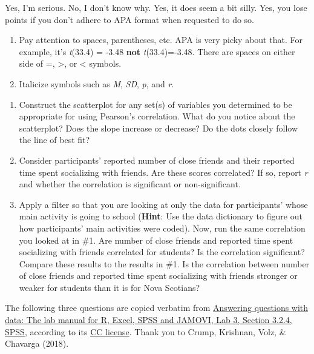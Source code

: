 \documentclass[
]{book}
\begin{document}
Yes, I'm serious. No, I don't know why. Yes, it does seem a bit silly. Yes, you lose points if you don't adhere to APA format when requested to do so.

\begin{enumerate}
\def\labelenumi{\alph{enumi}.}
\setcounter{enumi}{3}
\item
  Pay attention to spaces, parentheses, etc. APA is very picky about that. For example, it's \emph{t}(33.4) = -3.48 \textbf{not} \emph{t}(33.4)=-3.48. There are spaces on either side of =, \textgreater, or \textless{} symbols.
\item
  Italicize symbols such as \emph{M}, \emph{SD}, \emph{p}, and \emph{r}.
\end{enumerate}

\begin{enumerate}
\def\labelenumi{\arabic{enumi}.}
\setcounter{enumi}{3}
\item
  Construct the scatterplot for any set(s) of variables you determined to be appropriate for using Pearson's correlation. What do you notice about the scatterplot? Does the slope increase or decrease?
  Do the dots closely follow the line of best fit?
\item
  Consider participants' reported number of close friends and their reported time spent socializing with friends. Are these scores correlated? If so, report \emph{r} and whether the correlation is significant or non-significant.
\item
  Apply a filter so that you are looking at only the data for participants' whose main activity is going to school (\textbf{Hint}: Use the data dictionary to figure out how participants' main activities were coded). Now, run the same correlation you looked at in \#1. Are number of close friends and reported time spent socializing with friends correlated for students? Is the correlation significant? Compare these results to the results in \#1. Is the correlation between number of close friends and reported time spent socializing with friends stronger or weaker for students than it is for Nova Scotians?
\end{enumerate}

The following three questions are copied verbatim from \href{https://www.crumplab.com/statisticsLab/lab-3-correlation.html\#writing-assignment-2}{Answering questions with data: The lab manual for R, Excel, SPSS and JAMOVI, Lab 3, Section 3.2.4, SPSS}, according to its \href{https://creativecommons.org/licenses/by-sa/4.0/deed.ast}{CC license}. Thank you to Crump, Krishnan, Volz, \& Chavarga (2018).
\end{document}
